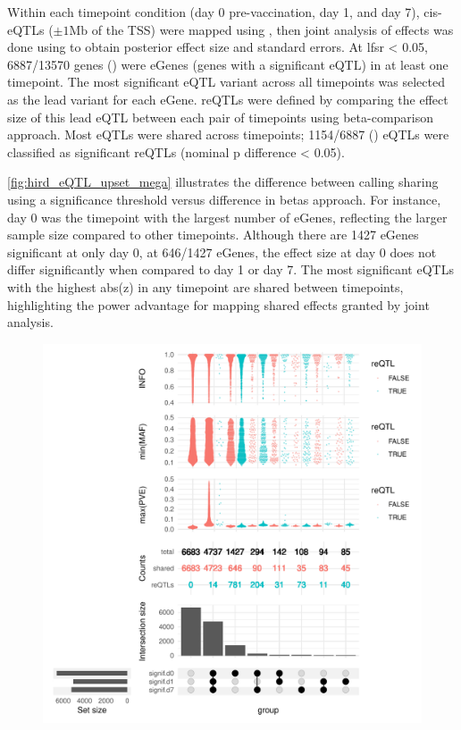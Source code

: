 Within each timepoint condition (day 0 pre-vaccination, day 1, and day 7), cis-\glspl{eQTL} ($\pm 1 \text{Mb}$ of the \gls{TSS}) were mapped using ,
then joint analysis of effects was done using  to obtain posterior effect size and standard errors.
At \gls{lfsr} < 0.05, 6887/13570 genes () were eGenes (genes with a significant \gls{eQTL}) in at least one timepoint.
The most significant \gls{eQTL} variant across all timepoints was selected as the lead variant for each eGene.
\glspl{reQTL} were defined by comparing the effect size of this lead \gls{eQTL} between each pair of timepoints using beta-comparison approach.
Most \glspl{eQTL} were shared across timepoints; 1154/6887 () \glspl{eQTL} were classified as significant \glspl{reQTL} (nominal p difference < 0.05).

\autoref{fig:hird_eQTL_upset_mega} illustrates the difference between calling sharing using a significance threshold versus difference in betas approach.
For instance, day 0 was the timepoint with the largest number of eGenes, reflecting the larger sample size compared to other timepoints.
Although there are 1427 eGenes significant at only day 0, at 646/1427 eGenes, the effect size at day 0 does not differ significantly when compared to day 1 or day 7.
The most significant \glspl{eQTL} with the highest abs(z) in any timepoint are shared between timepoints, highlighting the power advantage for mapping shared effects granted by joint analysis.

\begin{figure}
    \centering
    \includegraphics[width=1.0\textwidth]{mainmatter/figures/chapter_03/compare_dge_eqtl.upset.pdf}
    \caption{}
    \label{fig:hird_eQTL_upset_mega}
\end{figure}

